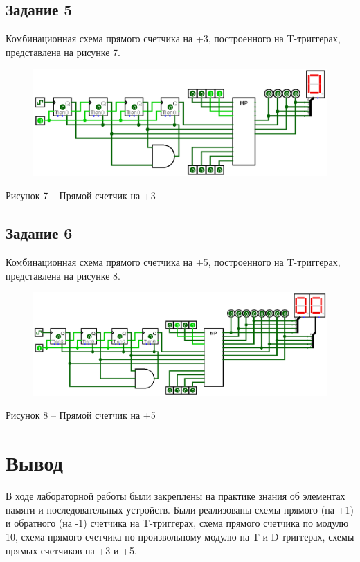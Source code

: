 \documentclass[a4paper,14pt]{extarticle}
\begin{document}
	\subsection*{Задание 5}
	Комбинационная схема прямого счетчика на +3, построенного на T-триггерах, представлена на рисунке 7.
	
	\begin{figure}[h]
		\centering
		\includegraphics[width=0.8\linewidth]{images/s-5}
	\end{figure}
	\begin{center}
		Рисунок 7 – Прямой счетчик на +3
	\end{center}
	
	\pagebreak
	\subsection*{Задание 6}
	Комбинационная схема прямого счетчика на +5, построенного на T-триггерах, представлена на рисунке 8.
	
	\begin{figure}[h]
		\centering
		\includegraphics[width=0.8\linewidth]{images/s-6}
	\end{figure}
	\begin{center}
		Рисунок 8 – Прямой счетчик на +5
	\end{center}
	
	\section*{Вывод}
	В ходе лабораторной работы были закреплены на практике знания об элементах памяти и последовательных устройств. Были реализованы схемы прямого (на +1) и обратного (на -1) счетчика на T-триггерах, схема прямого счетчика по модулю 10, схема прямого счетчика по произвольному модулю на T и D триггерах, схемы прямых счетчиков на +3 и +5.
	
\end{document}
